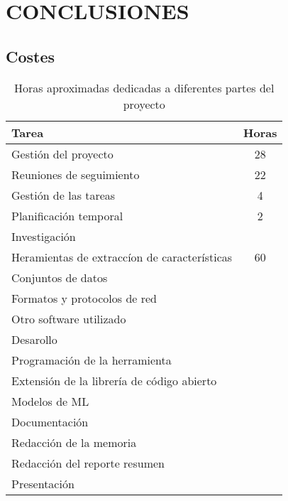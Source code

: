 \newpage
\pagestyle{plain}

\chapter{CONCLUSIONES}

\section{Costes}

\begin{table}[H]
  \centering
  \begin{tabular}{|l | c |}
      \hline
      \textbf{Tarea}                                & \textbf{Horas}       \\  
      \hline
      \rowcolor{lightgray} Gestión del proyecto     &  28                  \\
      Reuniones de seguimiento                      &  22                  \\
      Gestión de las tareas                         &   4                  \\
      Planificación temporal                        &   2                  \\  
      \hline
      \rowcolor{lightgray} Investigación            &                      \\
      Heramientas de extraccíon de características  &  60                  \\
      Conjuntos de datos                            &                      \\
      Formatos y protocolos de red                  &                      \\
      Otro software utilizado                       &                      \\
      \hline
      \rowcolor{lightgray} Desarollo                &                      \\
      Programación de la herramienta                &                      \\
      Extensión de la librería de código abierto    &                      \\
      Modelos de ML                                 &                      \\
      \rowcolor{lightgray} Documentación            &                      \\
      Redacción de la memoria                       &                      \\
      Redacción del reporte resumen                 &                      \\
      Presentación                                  &                      \\
      \hline
  \end{tabular}
  \caption{Horas aproximadas dedicadas a diferentes partes del proyecto}
  \label{table:horasdedicadas}
\end{table}

